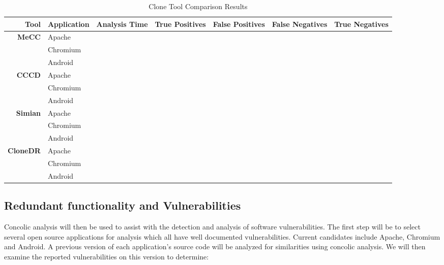 \documentclass{article}
\begin{document}
\begin{table}[thb!]

\begin{center}

\begin{tabular}{r||l|l|l|l|l|l}
  \hline
\bfseries Tool & \bfseries Application & \bfseries Analysis Time & \bfseries True Positives & \bfseries False Positives & \bfseries  False Negatives & \bfseries  True Negatives \\ \hline\hline
  \bfseries MeCC& Apache &  &  &  &  &  \\ \cline{2-7}
   & Chromium &  &  &  &  &  \\ \cline{2-7}
& Android  &  &  &  &  &  \\ \cline{2-7}
  \hline
  \bfseries  CCCD  & Apache &  &  &  &  &  \\ \cline{2-7}
 & Chromium &  &  &  &  &  \\ \cline{2-7}
& Android  &  &  &  &  &  \\ \cline{2-7}
  \hline
  \bfseries Simian & Apache &  &  &  &  &  \\ \cline{2-7}
   & Chromium &  &  &  &  &  \\ \cline{2-7}
& Android  &  &  &  &  &  \\ \cline{2-7}
  \hline
  \bfseries CloneDR & Apache &  &  &  &  &  \\ \cline{2-7}
   & Chromium &  &  &  &  &  \\ \cline{2-7}
& Android  &  &  &  &  &  \\ \cline{2-7}
  \hline

  \hline

\end{tabular}

\end{center}
\caption{Clone Tool Comparison Results}
\label{table:clonecomparisionresults}
\end{table}


\subsection{Redundant functionality and Vulnerabilities}

Concolic analysis will then be used to assist with the detection and analysis of software vulnerabilities. The first step will be to select several open source applications for analysis which all have well documented vulnerabilities. Current candidates include Apache, Chromium and Android. A previous version of each application's source code will be analyzed for similarities using concolic analysis. We will then examine the reported vulnerabilities on this version to determine:
\end{document}
